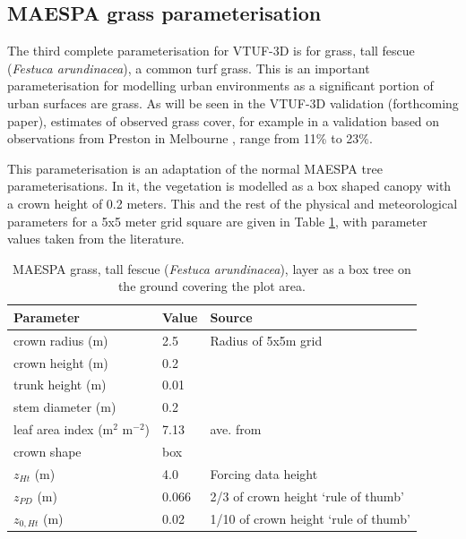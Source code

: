 \documentclass[final,3p,times,authoryear]{elsarticle}
\begin{document}


\subsection{MAESPA grass parameterisation}
The third complete parameterisation for VTUF-3D is for grass, tall fescue (\textit{Festuca arundinacea}), a common turf grass. This is an important parameterisation for modelling urban environments as a significant portion of urban surfaces are grass. As will be seen in the VTUF-3D validation (forthcoming paper), estimates of observed grass cover, for example in a validation based on observations from Preston in Melbourne \citep{Coutts2007,Nury2015}, range from 11\% to 23\%. 

This parameterisation is an adaptation of the normal MAESPA tree parameterisations. In it, the vegetation is modelled as a box shaped canopy with a crown height of 0.2 meters. This and the rest of the physical and meteorological parameters for a 5x5 meter grid square are given in Table \ref{tab:grassscaled}, with parameter values taken from the literature.

\begin{center}
\begin{table}[!htbp]
\caption{MAESPA grass, tall fescue (\textit{Festuca arundinacea}), layer as a box tree on the ground covering the plot area. \label{tab:grassscaled}}
\begin{tabular}{ |  l | l | l |}
\hline \textbf{Parameter} & \textbf{Value} & \textbf{Source} \\  \hline
crown radius (m) & 2.5& Radius of 5x5m grid \\ \hline
crown height (m) & 0.2& \cite{Simmons2011} \\ \hline
trunk height (m) & 0.01& \\ \hline
stem diameter (m) & 0.2 &\\ \hline
leaf area index (m$^{2}$ m$^{-2}$)& 7.13 & ave. from \cite{Bijoor2014} \\ \hline
crown shape & box& \\ \hline
$z_{Ht}$ (m)&4.0&Forcing data height \\ \hline
$z_{PD}$ (m) &0.066 & 2/3 of crown height `rule of thumb' \citep{Grimmond1999}\\ \hline
$z_{0,Ht}$ (m) & 0.02 & 1/10 of crown height `rule of thumb' \citep{Grimmond1999}\\ \hline
\end{tabular} 
\end{table}
\end{center}
\end{document}
